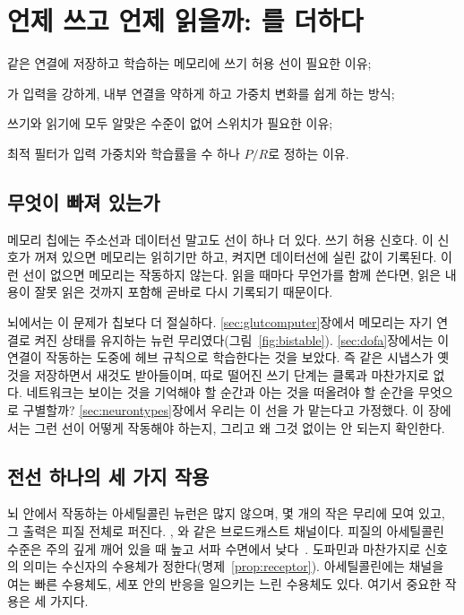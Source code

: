 \chapter{언제 쓰고 언제 읽을까: 를 더하다}
\label{sec:acet}
\begin{chaptergoals}
\item 같은 연결에 저장하고 학습하는 메모리에 쓰기 허용 선이 필요한 이유;
\item {}가 입력을 강하게, 내부 연결을 약하게 하고 가중치 변화를 쉽게 하는 방식;
\item 쓰기와 읽기에 모두 알맞은  수준이 없어 스위치가 필요한 이유;
\item 최적 필터가 입력 가중치와 학습률을 수 하나 $P/R$로 정하는 이유.
\end{chaptergoals}

\section{무엇이 빠져 있는가}

메모리 칩에는 주소선과 데이터선 말고도 선이 하나 더 있다. 쓰기 허용 신호다. 이 신호가 꺼져 있으면 메모리는 읽히기만 하고, 켜지면 데이터선에 실린 값이 기록된다. 이런 선이 없으면 메모리는 작동하지 않는다. 읽을 때마다 무언가를 함께 쓴다면, 읽은 내용이 잘못 읽은 것까지 포함해 곧바로 다시 기록되기 때문이다.

뇌에서는 이 문제가 칩보다 더 절실하다. \ref{sec:glutcomputer}장에서 메모리는 자기 연결로 켜진 상태를 유지하는  뉴런 무리였다(그림~\ref{fig:bistable}). \ref{sec:dofa}장에서는 이 연결이 작동하는 도중에 헤브 규칙으로 학습한다는 것을 보았다. 즉 같은 시냅스가 옛것을 저장하면서 새것도 받아들이며, 따로 떨어진 쓰기 단계는 클록과 마찬가지로 없다. 네트워크는 보이는 것을 기억해야 할 순간과 아는 것을 떠올려야 할 순간을 무엇으로 구별할까? \ref{sec:neurontypes}장에서 우리는 이 선을 가 맡는다고 가정했다. 이 장에서는 그런 선이 어떻게 작동해야 하는지, 그리고 왜 그것 없이는 안 되는지 확인한다.

\section{전선 하나의 세 가지 작용}

뇌 안에서 작동하는 아세틸콜린 뉴런은 많지 않으며, 몇 개의 작은 무리에 모여 있고, 그 출력은 피질 전체로 퍼진다. , 와 같은 브로드캐스트 채널이다. 피질의 아세틸콜린 수준은 주의 깊게 깨어 있을 때 높고 서파 수면에서 낮다~\cite{Hasselmo1999}. 도파민과 마찬가지로 신호의 의미는 수신자의 수용체가 정한다(명제~\ref{prop:receptor}). 아세틸콜린에는 채널을 여는 빠른 수용체도, 세포 안의 반응을 일으키는 느린 수용체도 있다. 여기서 중요한 작용은 세 가지다.

